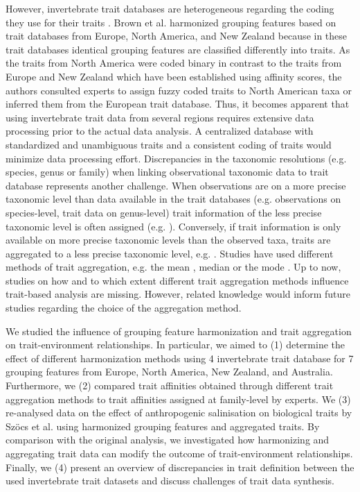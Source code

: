 \documentclass{article}
\begin{document}
However, invertebrate trait databases are heterogeneous regarding the coding they use for their traits \cite{culp_incorporating_2011}. Brown et al. \cite{brown_functional_2018} harmonized grouping features based on trait databases from Europe, North America, and New Zealand because in these trait databases identical grouping features are classified differently into traits. As the traits from North America were coded binary in contrast to the traits from Europe and New Zealand which have been established using affinity scores, the authors consulted experts to assign fuzzy coded traits to North American taxa or inferred them from the European trait database. Thus, it becomes apparent that using invertebrate trait data from several regions requires extensive data processing prior to the actual data analysis. A centralized database with standardized and unambiguous traits and a consistent coding of traits would minimize data processing effort.
Discrepancies in the taxonomic resolutions (e.g. species, genus or family) when linking observational taxonomic data to trait database represents another challenge. When observations are on a more precise taxonomic level than data available in the trait databases (e.g. observations on species-level, trait data on genus-level) trait information of the less precise taxonomic level is often assigned (e.g. \cite{szocs_effects_2014, vos_taxonomic_2017}). Conversely, if trait information is only available on more precise taxonomic levels than the observed taxa, traits are aggregated to a less precise taxonomic level, e.g. \cite{poff_functional_2006, szocs_effects_2014, piliere_a._f._h._importance_2016, aspin_extreme_2019}. Studies have used different methods of trait aggregation, e.g. the mean \cite{magliozzi_functional_2019}, median \cite{szocs_effects_2014} or the mode \cite{piliere_a._f._h._importance_2016}. Up to now, studies on how and to which extent different trait aggregation methods influence trait-based analysis are missing. However, related knowledge would inform future studies regarding the choice of the aggregation method.

We studied the influence of grouping feature harmonization and trait aggregation on trait-environment relationships. In particular, we aimed to (1) determine the effect of different harmonization methods using 4 invertebrate trait database for 7 grouping features from Europe, North America, New Zealand, and Australia. Furthermore, we (2) compared trait affinities obtained through different trait aggregation methods to trait affinities assigned at family-level by experts. We (3) re-analysed data on the effect of anthropogenic salinisation on biological traits by Szöcs et al. \cite{szocs_effects_2014} using harmonized grouping features and aggregated traits. By comparison with the original analysis, we investigated how harmonizing and aggregating trait data can modify the outcome of trait-environment relationships. Finally, we (4) present an overview of discrepancies in trait definition between the used invertebrate trait datasets and discuss challenges of trait data synthesis.
\end{document}

